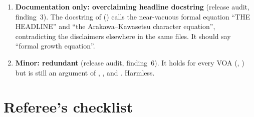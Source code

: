 \begin{enumerate}
  \allowbreak{}\allowbreak{}\allowbreak{}, \allowbreak{}\allowbreak{}\allowbreak{}\allowbreak{}\allowbreak{} depended on
  the then-axiom  although -free twins existed. The two formal-ODE statements are now routed
  through the Wakimoto vacuum, and  is a theorem (), so
  every declaration of this chapter reports Lean's three standard axioms and ``without '' is not a
  meaningful selling point.
\item \textbf{Documentation only: overclaiming headline docstring} (release audit, finding~3). The docstring of
  \allowbreak{}\allowbreak{}\allowbreak{}\allowbreak{} ()
  calls the near-vacuous formal equation ``THE HEADLINE'' and ``the Arakawa--Kawasetsu character equation'', contradicting
  the disclaimers elsewhere in the same files. It should say ``formal growth equation''.
\item \textbf{Minor: redundant } (release audit, finding~6). It holds for every VOA
  (, ) but is still an argument of
  \allowbreak{}\allowbreak{}\allowbreak{}\allowbreak{},
  \allowbreak{}\allowbreak{}, \allowbreak{} and
  \allowbreak{}\allowbreak{}. Harmless.
\end{enumerate}

\section{Referee's checklist}\label{l16:sec:checklist}

